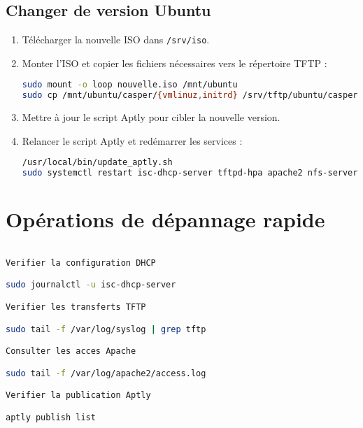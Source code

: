 \documentclass[a4paper,12pt]{article}
\begin{document}
\subsection{Changer de version Ubuntu}
\begin{enumerate}
\item Télécharger la nouvelle ISO dans \texttt{/srv/iso}.
\item Monter l’ISO et copier les fichiers nécessaires vers le répertoire TFTP :
\begin{lstlisting}[language=bash]
sudo mount -o loop nouvelle.iso /mnt/ubuntu
sudo cp /mnt/ubuntu/casper/{vmlinuz,initrd} /srv/tftp/ubuntu/casper/
\end{lstlisting}
\item Mettre à jour le script Aptly pour cibler la nouvelle version.
\item Relancer le script Aptly et redémarrer les services :
\begin{lstlisting}[language=bash]
/usr/local/bin/update_aptly.sh
sudo systemctl restart isc-dhcp-server tftpd-hpa apache2 nfs-server
\end{lstlisting}
\end{enumerate}

\section{Opérations de dépannage rapide}
\begin{lstlisting}[language=bash]

Verifier la configuration DHCP

sudo journalctl -u isc-dhcp-server

Verifier les transferts TFTP

sudo tail -f /var/log/syslog | grep tftp

Consulter les acces Apache

sudo tail -f /var/log/apache2/access.log

Verifier la publication Aptly

aptly publish list
\end{lstlisting}
\end{document}
